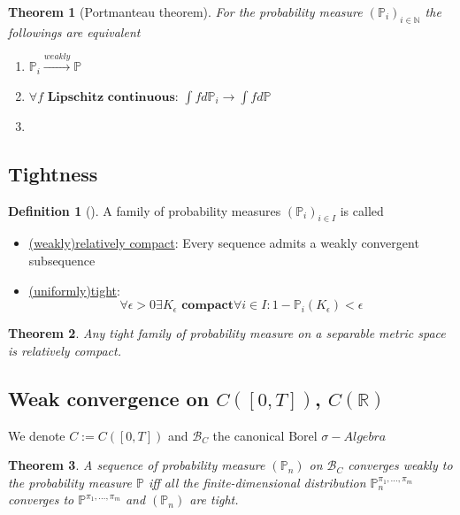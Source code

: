\documentclass[a4paper,11pt]{book}
\newtheorem{theorem}{Theorem}[section]
\theoremstyle{definition}
\newtheorem{definition}{Definition}[section]
\theoremstyle{remark}
\begin{document}
\begin{theorem}[Portmanteau theorem]
For the probability measure $(\mathbb{P}_i)_{i \in \mathbb{N}}$ the followings are equivalent
\begin{enumerate}
	\item $\mathbb{P}_i \overset{weakly}{\rightarrow} \mathbb{P}$
	\item $\forall f \textbf{ Lipschitz continuous: } \int f d\mathbb{P}_i \rightarrow \int f d\mathbb{P} $
	\item 
\end{enumerate}
\end{theorem}


\subsection{Tightness}
\begin{definition}[]
A family of probability measures $(\mathbb{P}_i)_{i \in I}$ is called 
\begin{itemize}
	\item \underline{(weakly)relatively compact}: Every sequence admits a weakly convergent subsequence
	\item \underline{(uniformly)tight}:
	\begin{equation*}
		\forall \epsilon > 0 \exists K_\epsilon \textbf{ compact} \forall i \in I: 1-\mathbb{P}_i(K_\epsilon) < \epsilon
	\end{equation*}
\end{itemize}
\end{definition}

\begin{theorem}
	Any tight family of probability measure on a separable metric space is relatively compact.
\end{theorem}


\subsection{Weak convergence on $C([0, T])$, $C(\mathbb{R})$}
We denote $C:= C([0, T])$ and $\mathcal{B}_C$ the canonical Borel $\sigma-Algebra$
\begin{theorem}
	A sequence of probability measure $(\mathbb{P}_n)$ on $\mathcal{B}_C$ converges weakly to the probability measure $\mathbb{P}$ iff all the finite-dimensional distribution $\mathbb{P}^{\pi_1, \dots, \pi_m}_n$ converges to $\mathbb{P}^{\pi_1, \dots, \pi_m}$ and $(\mathbb{P}_n)$ are tight.
\end{theorem}
\end{document}
